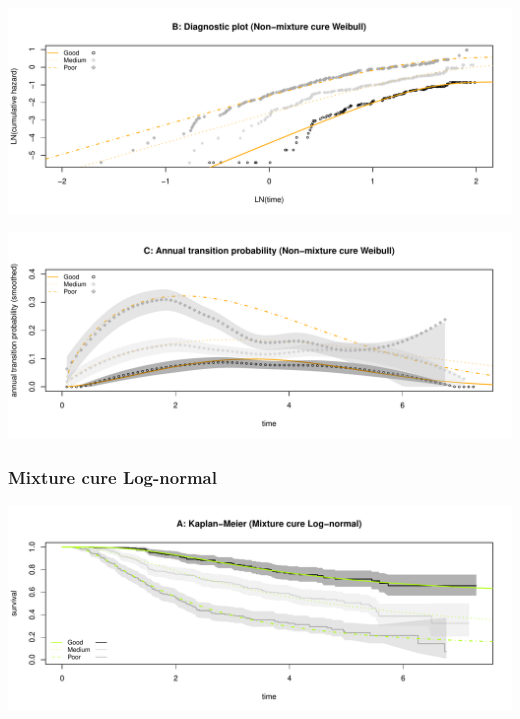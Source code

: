 \documentclass[
]{article}
\begin{document}
\begin{flushleft}\includegraphics[height=0.25\textheight]{BC_OS_output/Images/Figure_cure_models-5} \end{flushleft}

\begin{flushleft}\includegraphics[height=0.25\textheight]{BC_OS_output/Images/Figure_cure_models-6} \end{flushleft}

\clearpage

\subsubsection{Mixture cure Log-normal}\label{mixture-cure-log-normal}

\begin{flushleft}\includegraphics[height=0.25\textheight]{BC_OS_output/Images/Figure_cure_models-7} \end{flushleft}
\end{document}
